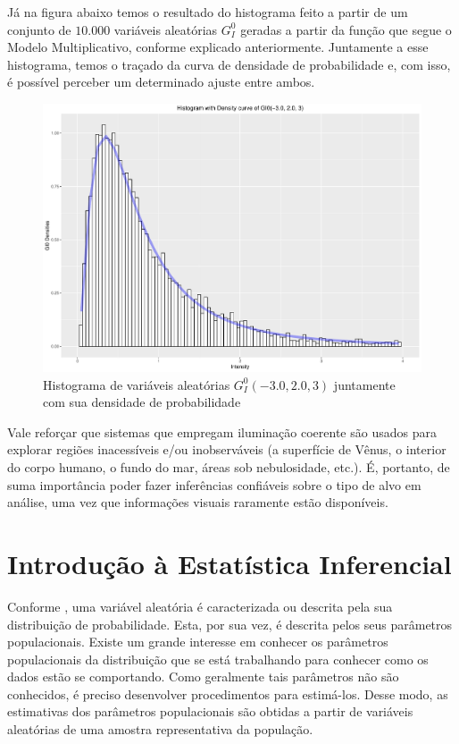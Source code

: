 Já na figura abaixo temos o resultado do histograma feito a partir de um conjunto de $10.000$ variáveis aleatórias $G_I^0$ geradas a partir da função que segue o Modelo Multiplicativo, conforme explicado anteriormente. Juntamente a esse histograma, temos o traçado da curva de densidade de probabilidade e, com isso, é possível perceber um determinado ajuste entre ambos.

\begin{figure}[H]
     \centering
     \includegraphics[scale=0.5]{plots/GI0RandVar.pdf}
     \caption{Histograma de variáveis aleatórias $G_I^0(-3.0, 2.0, 3)$ juntamente com sua densidade de probabilidade}
     \label{graf_2}
\end{figure}

Vale reforçar que sistemas que empregam iluminação coerente são usados para explorar regiões inacessíveis e/ou inobserváveis (a superfície de Vênus, o interior do corpo humano, o fundo do mar, áreas sob nebulosidade, etc.). É, portanto, de suma importância poder fazer inferências confiáveis sobre o tipo de alvo em análise, uma vez que informações visuais raramente estão disponíveis.

				

\section{Introdução à Estatística Inferencial}

Conforme \citet{CasellaBergerStatisticalInference}, uma variável aleatória é caracterizada ou descrita pela sua distribuição de probabilidade. Esta, por sua vez, é descrita pelos seus parâmetros populacionais. Existe um grande interesse em conhecer os parâmetros populacionais da distribuição que se está trabalhando para conhecer como os dados estão se comportando. Como geralmente tais parâmetros não são conhecidos, é preciso desenvolver procedimentos para estimá-los. Desse modo, as estimativas dos parâmetros populacionais são obtidas a partir de variáveis aleatórias de uma amostra representativa da população.
 
